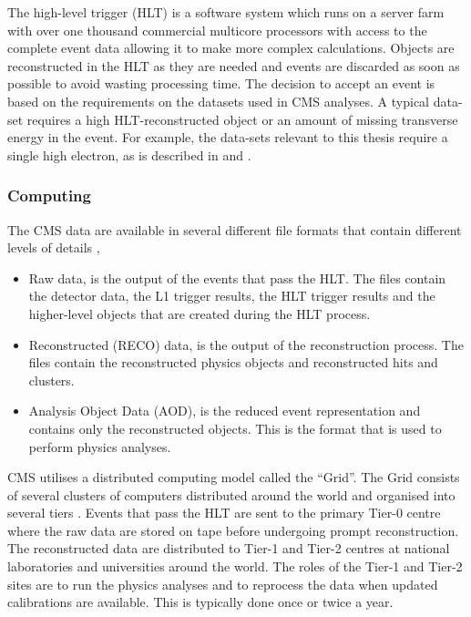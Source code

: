 The high-level trigger (HLT) is a software system which runs on a server farm
with over one thousand commercial multicore processors with access to the
complete event data allowing it to make more complex calculations. 
Objects are reconstructed in the HLT as they are needed and events are discarded
as soon as possible to avoid wasting processing time.
The decision to accept an event is based on the requirements on the datasets
used in {CMS} analyses. A typical data-set requires a high \pT
HLT-reconstructed object or an amount of missing transverse energy in the event.
For example, the data-sets relevant to this thesis require a single high \pT
electron, as is described in  and
.

\subsubsection{Computing}

The {CMS} data are available in several different file formats that contain
different levels of details \cite{grandi2004cms},
\begin{itemize}
\item Raw data, is the output of the events that pass the {HLT}. The files
contain the detector data, the {L1} trigger results, the {HLT} trigger
results and the higher-level objects that are created during the {HLT}
process.
\item Reconstructed (RECO) data, is the output of the reconstruction process.
The files contain the reconstructed physics objects and reconstructed hits and
clusters.
\item Analysis Object Data (AOD), is the reduced event representation and
contains only the reconstructed objects. This is the format that is used to
perform physics analyses.
\end{itemize}

CMS utilises a distributed computing model called the ``Grid''.  The Grid
consists of several clusters of computers distributed around the world and
organised into several tiers \cite{grandi2004cms}.  Events that pass the {HLT}
are sent to the primary Tier-0 centre where the raw data are stored on tape
before undergoing prompt reconstruction. The reconstructed data are distributed
to Tier-1 and Tier-2 centres at national laboratories and universities around the
world. The roles of the Tier-1 and Tier-2 sites are to run the physics analyses
and to reprocess the data when updated calibrations are available. This is
typically done once or twice a year.

